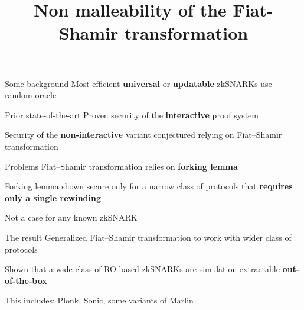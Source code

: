 \documentclass[aspectratio=169,handout]{beamer}
\title{Non malleability of the Fiat-Shamir transformation}
\author{\scriptsize{Michal Zajac \inst{1} \and Markulf Kohlweiss \inst{2}}}
\institute{\inst{1} Clearmatics \inst{2}IOHK}
\date{}
\renewcommand{\emph}[1]{\textbf{#1}}
\begin{document}
\begin{frame}
\titlepage
\end{frame}

\begin{frame}
  \begin{block}{Some background}
    Most efficient \emph{universal} or \emph{updatable} zkSNARKs use random-oracle
  \end{block}\pause  

  \begin{block}{Prior state-of-the-art}
    Proven security of the \emph{interactive} proof system

    Security of the \emph{non-interactive} variant conjectured
      relying on Fiat--Shamir transformation
  \end{block}\pause

  \begin{block}{Problems}
    Fiat--Shamir transformation relies on \emph{forking lemma}

    Forking lemma shown secure only for a narrow class of protocols
    that \emph{requires only a single rewinding}

    Not a case for any known zkSNARK
  \end{block}\pause

  \begin{block}{The result}
    Generalized Fiat--Shamir transformation to work with wider class of protocols
    
     Shown that a wide class of RO-based zkSNARKs are
     simulation-extractable \emph{out-of-the-box}
     
     This includes: Plonk, Sonic, some variants of Marlin
  \end{block}
\end{frame}
\end{document}
